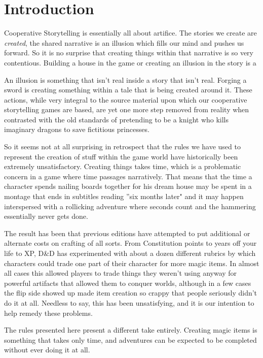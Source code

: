 \section{Introduction}

Cooperative Storytelling is essentially all about artifice. The stories we create are \textit{created}, the shared narrative is an illusion which fills our mind and pushes us forward. So it is no surprise that creating things within that narrative is so very contentious. Building a house in the game or creating an illusion in the story is a

An illusion is something that isn't real inside a story that isn't real. Forging a sword is creating something within a tale that is being created around it. These actions, while very integral to the source material upon which our cooperative storytelling games are based, are yet one more step removed from reality when contrasted with the old standards of pretending to be a knight who kills imaginary dragons to save fictitious princesses.

So it seems not at all surprising in retrospect that the rules we have used to represent the creation of stuff within the game world have historically been extremely unsatisfactory. Creating things takes time, which is a problematic concern in a game where time passages narratively. That means that the time a character spends nailing boards together for his dream house may be spent in a montage that ends in subtitles reading ''six months later" and it may happen interspersed with a rollicking adventure where seconds count and the hammering essentially never gets done.

The result has been that previous editions have attempted to put additional or alternate costs on crafting of all sorts. From Constitution points to years off your life to XP, D\&D has experimented with about a dozen different rubrics by which characters could trade one part of their character for more magic items. In almost all cases this allowed players to trade things they weren't using anyway for powerful artifacts that allowed them to conquer worlds, although in a few cases the flip side showed up made item creation so crappy that people seriously didn't do it at all. Needless to say, this has been unsatisfying, and it is our intention to help remedy these problems.

The rules presented here present a different take entirely. Creating magic items is something that takes only time, and adventures can be expected to be completed without ever doing it at all.

